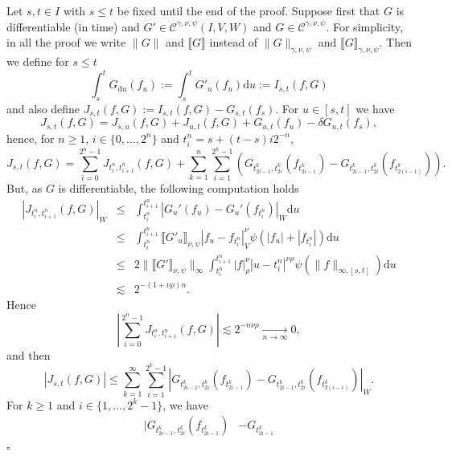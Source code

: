 \documentclass[a4paper,11pt]{article}
\newcommand{\assign}{:=}
\newcommand{\mathd}{\mathrm{d}}
\newenvironment{proof}{{\sc Proof.}}{\hfill$\square$}
\newcommand{\CC}{\mathscr C}
\begin{document}
\begin{proof}
  Let $s,t \in I$ with $s \leqslant t$ be fixed until the end of the proof.
  Suppose first that $G$ is differentiable (in time) and $G' \in \CC^{\gamma ,
  \nu , \psi} (I,V,W)$ and $G \in \CC^{\gamma , \nu , \psi}$. For simplicity,
  in all the proof we write $\| G \|$ and $\llbracket G \rrbracket$ instead of
  $\| G \|_{\gamma , \nu , \psi}$ and $\llbracket G \rrbracket_{\gamma , \nu ,
  \psi}$. Then we define for $s \leqslant t$
  \[ \int_{s}^{t} G_{\mathd u} (f_{u} ) \assign \int_{s}^{t} G'_{u} (f_{u} )
     \mathd u \assign I_{s,t} (f,G) \]
  and also define $J_{s,t} (f,G) \assign I_{s,t} (f,G) -G_{s,t} (f_{s} )$. For
  $u \in [s,t]$ we have
  \[ J_{s,t} (f,G) =J_{s,u} (f,G) +J_{u,t} (f,G) +G_{u,t} (f_{u} ) - \delta
     G_{u,t} (f_{s} ), \]
  hence, for $n \ge 1$, $i \in \{0, \ldots ,2^{n} \}$ and $t_{i}^{n} =s+ (t-s)
  i2^{-n}$,
  \[ J_{s,t} (f,G) = \sum_{i=0}^{2^{n} -1} J_{t_{i}^{n} ,t_{i+1}^{n}} (f,G) +
     \sum_{k=1}^{n} \sum_{i=1}^{2^{k} -1} (G_{t_{2i-1}^{k} ,t_{2i}^{k}}
     (f_{t_{2i-1}^{k}} )-G_{t_{2i-1}^{k} ,t_{2i}^{k}} (f_{t_{2(i-1)}^{k}} )).
  \]
  But, as $G$ is differentiable, the following computation holds
  \begin{eqnarray*}
    | J_{t_{i}^{n} ,t_{i+1}^{n}} (f,G) |_{W} & \leqslant &
    \int_{t_{i}^{n}}^{t_{i+1}^{n}} | G_{u}' (f_{u} )-G_{u}' (f_{t_{i}^{n}} )
    |_{W} \mathd u\\
    & \leqslant & \int_{t_{i}^{n}}^{t_{i+1}^{n}}  \llbracket G'_{u}
    \rrbracket_{\nu , \psi} | f_{u} -f_{t_{i}^{n}} |^{\nu}_{V} \psi ( | f_{u}
    | + | f_{t_{i}^{n}} | ) \mathd u\\
    & \leqslant & 2 \| \llbracket G' \rrbracket_{\nu , \psi} \|_{\infty}
    \int_{t_{i}^{n}}^{t_{i+1}^{n}} | f |^{\nu}_{\rho}  |u-t_{i}^{n} |^{\nu
    \rho} \psi ( \| f \|_{\infty , [ s,t ]} ) \mathd u\\
    & \lesssim & 2^{- (1+ \nu \rho ) n}.
  \end{eqnarray*}
  Hence
  \[ \left\lvert \sum_{i=0}^{2^{n} -1} J_{t_{i}^{n} ,t_{i+1}^{n}} (f,G) \right\lvert
     \lesssim 2^{-n \nu \rho} \underset{n \to \infty}{\to} 0, \]
  and then
  \[ | J_{s,t} (f,G) | \leqslant \sum_{k=1}^{\infty} \sum_{i=1}^{2^{k} -1}
     |G_{t_{2i-1}^{k} ,t_{2i}^{k}} (f_{t_{2i-1}^{k}} )-G_{t_{2i-1}^{k}
     ,t_{2i}^{k}} (f_{t_{2(i-1)}^{k}} )|_{W} . \]
  For $k \ge 1$ and $i \in \{1, \ldots ,2^{k} -1\}$, we have
  \begin{equation*} \begin{split}
    | G_{t_{2i-1}^{k} ,t_{2i}^{k}} (f_{t_{2i-1}^{k}} )& -G_{t_{2i-1}^{k}
}
\end{split}
\end{equation*}
\end{proof}
\end{document}
